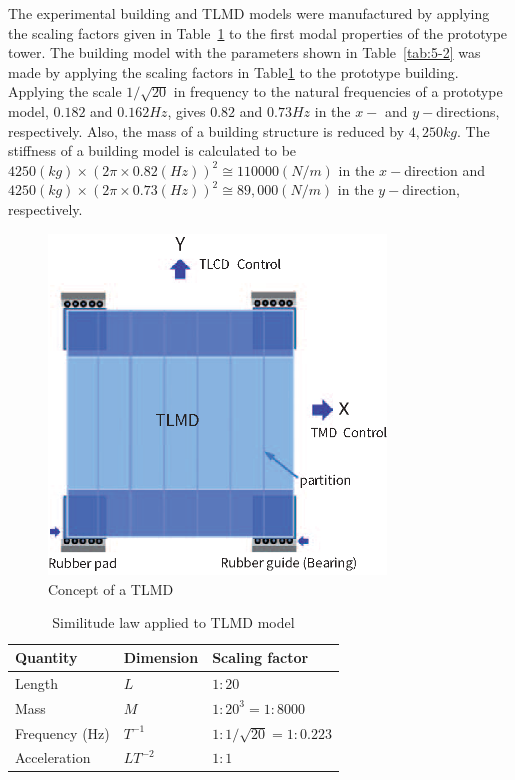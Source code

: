 The experimental building and TLMD models were manufactured by applying the scaling factors given in Table~\ref{tab:5-1} to the first modal properties of the prototype tower. The building model with the parameters shown in Table~\ref{tab:5-2} was made by applying the scaling factors in Table\ref{tab:5-1} to the prototype building. Applying the scale $1/\sqrt{20}$ in frequency to the natural frequencies of a prototype model, $0.182$ and $0.162Hz$, gives $0.82$ and $0.73Hz$ in the $x-$ and $y-$directions, respectively. Also, the mass of a building structure is reduced by $4,250kg$. The stiffness of a building model is calculated to be $4250(kg)\times \left(2\pi \times 0.82(Hz)\right)^{2}\cong 110 000(N/m)$ in the $x-$direction and $4250(kg)\times \left(2\pi \times 0.73(Hz)\right)^{2} \cong 89,000(N/m)$ in the $y-$direction, respectively.

\begin{figure}[ht]
\centering
\includegraphics[width=0.8\textwidth] {figure/5-1.eps}
\caption{Concept of a TLMD}
\label{fig:5-1}
\end{figure}

\begin{table}[ht]
\centering
\begin{tabularx}{\textwidth}{@{}X|X|X@{}}
\toprule[1pt]\midrule[0.3pt]
Quantity & Dimension & Scaling factor\\ \hline
Length & $L$ & $1:20$\\
Mass & $M$ & $1:20^{3} = 1:8000$\\
Frequency (Hz) & $T^{-1}$ & $1:1/\sqrt{20} = 1:0.223$\\
Acceleration & $LT^{-2}$ & $1:1$\\
\bottomrule
\end{tabularx}
\caption{Similitude law applied to TLMD model}
\label{tab:5-1}
\end{table}

